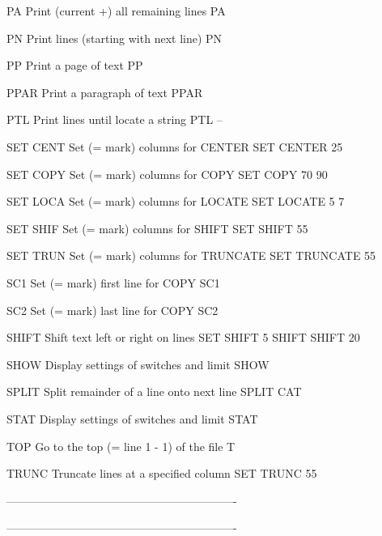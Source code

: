 PA        Print (current +) all remaining lines       PA
 
PN        Print lines (starting with next line)       PN
 
PP        Print a page of text                        PP
 
PPAR      Print a paragraph of text                   PPAR
 
PTL       Print lines until locate a string           PTL --
 
SET CENT  Set (= mark) columns for CENTER             SET CENTER 25
 
SET COPY  Set (= mark) columns for COPY               SET COPY 70 90
 
SET LOCA  Set (= mark) columns for LOCATE             SET LOCATE 5 7
 
SET SHIF  Set (= mark) columns for SHIFT              SET SHIFT 55
 
SET TRUN  Set (= mark) columns for TRUNCATE           SET TRUNCATE 55
 
SC1       Set (= mark) first line for COPY            SC1
 
SC2       Set (= mark) last  line for COPY            SC2
 
SHIFT     Shift text left or right on lines           SET SHIFT 5
                                                      SHIFT
                                                      SHIFT 20
 
SHOW      Display settings of switches and limit      SHOW
 
SPLIT     Split remainder of a line onto next line    SPLIT CAT
 
STAT      Display settings of switches and limit      STAT
 
TOP       Go to the top (= line 1 - 1) of the file    T
 
TRUNC     Truncate lines at a specified column        SET TRUNC 55
 
-------------------------------------------------------------
 
 
 
 
 
 
 
 
 
 
 
 
 
 
 
 
 
 
 
 
 
 
 
 
 
 
 
 
 
 
 
 
 
 
 
 
 
 
 
 
 
 
 
 
 
 
 
 
 
 
 
 
 
 
 
 
 
 
 
-------------------------------------------------------------

